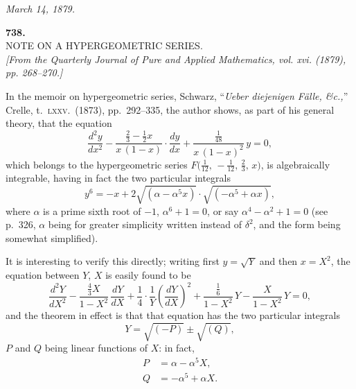 \documentclass[11pt]{article}
\begin{document}
\medskip

\noindent\textit{March 14, 1879.}

\bigskip

\begin{center}
\textbf{738.}\\[6pt]
\textsc{NOTE ON A HYPERGEOMETRIC SERIES.}\\[6pt]
\textit{[From the Quarterly Journal of Pure and Applied Mathematics, vol. xvi. (1879),\\
pp. 268--270.]}
\end{center}

\bigskip

In the memoir on hypergeometric series, Schwarz, ``\textit{Ueber diejenigen F\"alle, \&c.,}''
Crelle, t.\ \textsc{lxxv}.\ (1873), pp.\ 292--335, the author shows, as part of his general theory,
that the equation
\[
   \frac{d^2 y}{dx^2} - \frac{\tfrac{2}{3} - \tfrac{1}{2}x}{x\,(1 - x)}\cdot\frac{dy}{dx} + \frac{\tfrac{1}{48}}{x\,(1 - x)^2}\,y = 0,
\]
which belongs to the hypergeometric series $F\bigl(\tfrac{1}{12},\,-\tfrac{1}{12},\,\tfrac{2}{3},\,x\bigr)$, is algebraically integrable,
having in fact the two particular integrals
\[
   y^6 = -x + 2\sqrt{(\alpha - \alpha^5 x)} \cdot \sqrt{(-\alpha^5 + \alpha x)},
\]
where $\alpha$ is a prime sixth root of $-1$, $\alpha^6 + 1 = 0$, or say $\alpha^4 - \alpha^2 + 1 = 0$ (see p.\ 326,
$\alpha$ being for greater simplicity written instead of $\delta^2$, and the form being somewhat
simplified).

\bigskip

It is interesting to verify this directly; writing first $y = \sqrt{Y}$ and then $x = X^2$,
the equation between $Y$, $X$ is easily found to be
\[
   \frac{d^2 Y}{dX^2} - \frac{\tfrac{4}{3} X}{1 - X^2}\,\frac{dY}{dX} + \frac{1}{4}\cdot\frac{1}{Y}\left(\frac{dY}{dX}\right)^{\!2} + \frac{\tfrac{1}{6}}{1 - X^2}\,Y - \frac{X}{1 - X^2}\,Y = 0,
\]
and the theorem in effect is that that equation has the two particular integrals
\[
   Y = \sqrt{(-P)} \pm \sqrt{(Q)},
\]
$P$ and $Q$ being linear functions of $X$: in fact,
\begin{align*}
P &= \alpha - \alpha^5 X,\\
Q &= -\alpha^5 + \alpha X.
\end{align*}

\bigskip
\end{document}
